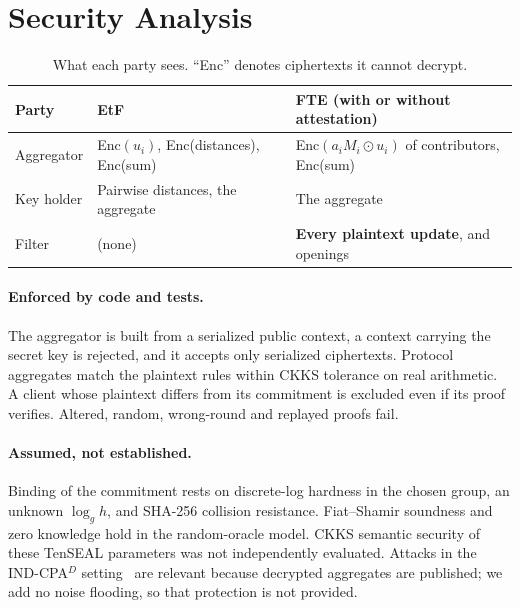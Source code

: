\section{Security Analysis}
\label{sec:security}

\begin{table}[H]
\centering
\caption{What each party sees. ``Enc'' denotes ciphertexts it cannot decrypt.}
\label{tab:visibility}
\begin{tabular}{lll}
\toprule
Party & EtF & FTE (with or without attestation) \\
\midrule
Aggregator & Enc$(u_i)$, Enc(distances), Enc(sum) & Enc$(a_i M_i\odot u_i)$ of contributors, Enc(sum) \\
Key holder & Pairwise distances, the aggregate & The aggregate \\
Filter & (none) & \textbf{Every plaintext update}, and openings \\
\bottomrule
\end{tabular}
\end{table}

\paragraph{Enforced by code and tests.}
The aggregator is built from a serialized public context, a context carrying the secret key is rejected, and it accepts only serialized ciphertexts. Protocol aggregates match the plaintext rules within CKKS tolerance on real arithmetic. A client whose plaintext differs from its commitment is excluded even if its proof verifies. Altered, random, wrong-round and replayed proofs fail.

\paragraph{Assumed, not established.}
Binding of the commitment rests on discrete-log hardness in the chosen group, an unknown $\log_g h$, and SHA-256 collision resistance. Fiat--Shamir soundness and zero knowledge hold in the random-oracle model. CKKS semantic security of these TenSEAL parameters was not independently evaluated. Attacks in the IND-CPA$^D$ setting~\cite{li2021ckkssecurity} are relevant because decrypted aggregates are published; we add no noise flooding, so that protection is not provided.

